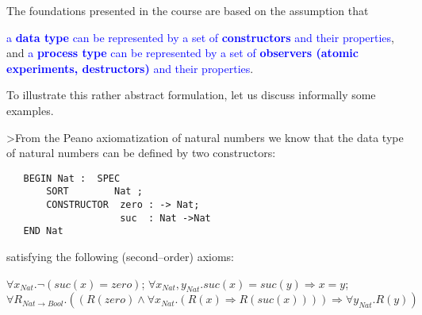 \documentclass[landscape, autoslides, light]{mmiss}
\newcommand{\ns}{\normalsize}
\begin{document}
\begin{Package}[Label={FSDPT}, Title={Formal Specification of Data and Process Types}, ShortTitle={FSDPT}, Authors={Horst Reichel}, Date={February 2003}, LevelOfDetail=Lecture, Language=en-GB]
\begin{Section}[Title={Introduction}, Label={section2}]
\begin{Paragraph}[Title={Axiomatic Specifications}, Label=Paragraph5]
\end{Paragraph}
\begin{Paragraph}[Title={Basic Intuition}, Label=Paragraph6]
\pause

The foundations presented in the course are based on the
assumption that \pause
\begin{List}[ListType=itemize]
    \ListItem \textcolor{blue}{a \textbf{data type} can be represented
    by a set of \textbf{constructors} and their properties}, and \pause
    \ListItem \textcolor{blue} {a \textbf{process type} can be
    represented by a set of \textbf{observers (atomic experiments, destructors)}
    and their properties}.
\end{List}

\end{Paragraph}
\begin{Paragraph}[Title={Basic Intuition}, Label=Paragraph7]

To illustrate this rather abstract formulation, let us discuss
informally some examples.


\end{Paragraph}
\begin{Paragraph}[Title={Basic Intuition}, Label=Paragraph8]


>From the Peano axiomatization of natural numbers we know that the
data type of natural numbers can be defined by two constructors:
\vspace{8mm} \small
\begin{verbatim}
   BEGIN Nat :  SPEC
       SORT        Nat ;
       CONSTRUCTOR  zero : -> Nat;
                    suc  : Nat ->Nat
   END Nat
\end{verbatim}
\ns


\end{Paragraph}
\begin{Paragraph}[Title={Basic Intuition}, Label=Paragraph9]

satisfying the following (second--order) axioms:\vspace{8mm}

 \begin{List}[ListType=enumeration]
 \ListItem $\forall x_{Nat}. \neg (suc(x) = zero )$; \pause
 \ListItem  $\forall x_{Nat} , y_{Nat} . suc(x) = suc(y) \Rightarrow
    x = y $; \pause
 \ListItem  $\forall R_{Nat \to Bool} . ((R(zero) \wedge \forall x_{Nat} .
   (R(x) \Rightarrow R(suc(x)))) \Rightarrow \forall y_{Nat} .
   R(y))$
 \end{List}


\end{Paragraph}
\end{Section}
\end{Package}
\end{document}
